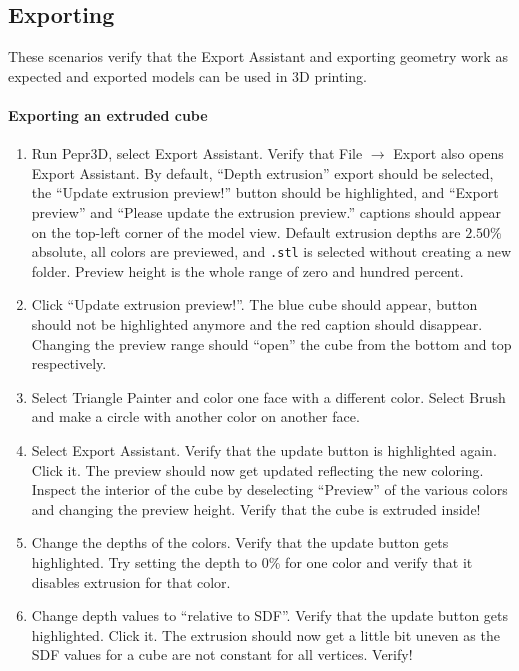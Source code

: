 \subsection{Exporting}

These scenarios verify that the Export Assistant and exporting geometry work as expected and exported models can be used in 3D printing.

\paragraph{Exporting an extruded cube}

\begin{enumerate}
\item Run Pepr3D, select Export Assistant. Verify that File $\rightarrow$ Export also opens Export Assistant. By default, ``Depth extrusion'' export should be selected, the ``Update extrusion preview!'' button should be highlighted, and ``Export preview'' and ``Please update the extrusion preview.'' captions should appear on the top-left corner of the model view. Default extrusion depths are $2.50\%$ absolute, all colors are previewed, and \texttt{.stl} is selected without creating a new folder. Preview height is the whole range of zero and hundred percent.
\item Click ``Update extrusion preview!''. The blue cube should appear, button should not be highlighted anymore and the red caption should disappear. Changing the preview range should ``open'' the cube from the bottom and top respectively.
\item Select Triangle Painter and color one face with a different color. Select Brush and make a circle with another color on another face.
\item Select Export Assistant. Verify that the update button is highlighted again. Click it. The preview should now get updated reflecting the new coloring. Inspect the interior of the cube by deselecting ``Preview'' of the various colors and changing the preview height. Verify that the cube is extruded inside!
\item Change the depths of the colors. Verify that the update button gets highlighted. Try setting the depth to $0\%$ for one color and verify that it disables extrusion for that color.
\item Change depth values to ``relative to SDF''. Verify that the update button gets highlighted. Click it. The extrusion should now get a little bit uneven as the SDF values for a cube are not constant for all vertices. Verify!

\end{enumerate}
